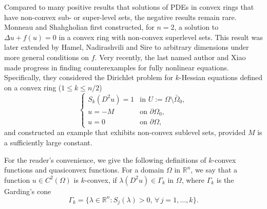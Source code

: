 \documentclass[reqno]{amsart}
\theoremstyle{remark}
\theoremstyle{definition}
\numberwithin{equation}{section}
\begin{document}
Compared to many positive results that solutions of PDEs in convex rings that have non-convex sub- or super-level sets, the negative results remain rare. Monneau and Shahgholian \cite{Monneau-Shahgholian-2005} first constructed, for $n=2$, a solution to $\Delta u+f(u)=0$ in a convex ring with non-convex superlevel sets. This result was later extended by Hamel, Nadirashvili and Sire \cite{Hamel-N-S} to arbitrary dimensions under more general conditions on $f$. Very recently, the last named author and Xiao \cite{Wang-Xiao} made progress in finding counterexamples for fully nonlinear equations. Specifically, they considered the Dirichlet problem for $k$-Hessian equations defined on a convex ring ($1\leq k\leq n/2$)
\begin{equation*}
	\begin{cases}
		S_k(D^2u)=1 & \text{in }U:=\Omega\setminus\bar{\Omega}_0, \\
		u=-M & \text{on }\partial\Omega_0, \\
		u=0 & \text{on }\partial\Omega,
	\end{cases}
\end{equation*}
and constructed an example that exhibits non-convex sublevel sets, provided $M$ is a sufficiently large constant.

For the reader's convenience, we give the following definitions of $k$-convex functions and quasiconvex functions. For a domain $\Omega$ in $\mathbb{R}^n$, we say that a function \( u \in C^2(\Omega) \) is \( k \)-convex, if \( \lambda(D^2u) \in \Gamma_k \) in \( \Omega \), where \( \Gamma_k \) is the  Garding's cone
\[
\Gamma_k = \{ \lambda \in \mathbb{R}^n: S_j(\lambda) > 0, \, \forall\, j = 1, \dots, k \}.
\]
\end{document}
